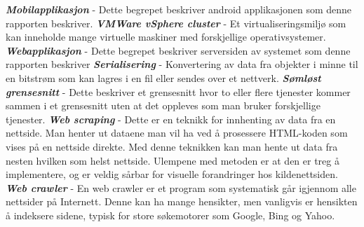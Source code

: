 \documentclass[../main.tex]{subfiles}
\begin{document}
\newline
\textbf{\textit{Mobilapplikasjon}} - Dette begrepet beskriver android applikasjonen som denne rapporten beskriver.\newline
\newline
\textbf{\textit{VMWare vSphere cluster}} - Et virtualiseringsmiljø som kan inneholde mange virtuelle maskiner med forskjellige operativsystemer.  \newline
\newline
\textbf{\textit{Webapplikasjon}} - Dette begrepet beskriver serversiden av systemet som denne rapporten beskriver\newline
\newline
\textbf{\textit{Serialisering}} - Konvertering av data fra objekter i minne til en bitstrøm som kan lagres i en fil eller sendes over et nettverk. \newline
\newline
\textbf{\textit{Sømløst grensesnitt}} - Dette beskriver et grensesnitt hvor to eller flere tjenester kommer sammen i et grensesnitt uten at det oppleves som man bruker forskjellige tjenester.\newline
\newline
\textbf{\textit{Web scraping}} - Dette er en teknikk for innhenting av data fra en nettside. Man henter ut dataene man vil ha ved å prosessere HTML-koden som vises på en nettside direkte. Med denne teknikken kan man hente ut data fra nesten hvilken som helst nettside. Ulempene med metoden er at den er treg å implementere, og er veldig sårbar for visuelle forandringer hos kildenettsiden. \newline
\newline
\textbf{\textit{Web crawler}} - En web crawler er et program som systematisk går igjennom alle nettsider på Internett. Denne kan ha mange hensikter, men vanligvis er hensikten å indeksere sidene, typisk for store søkemotorer som Google, Bing og Yahoo.\newline
\newline
\end{document}
